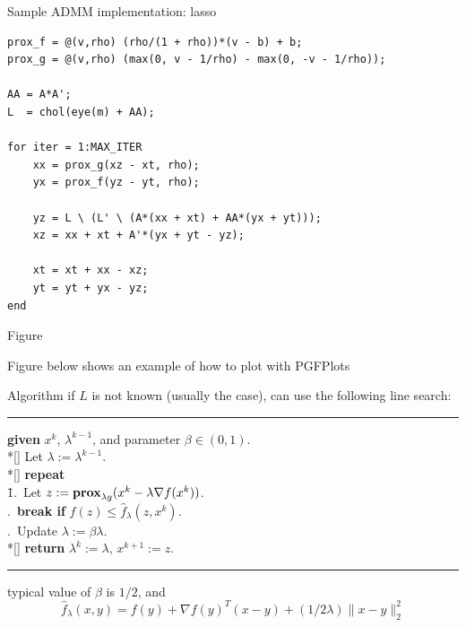 \documentclass[aspectratio=169,10pt,mathserif]{beamer}
\begin{document}
\begin{frame}[fragile]{Sample ADMM implementation: lasso}
	\small
\begin{verbatim}
prox_f = @(v,rho) (rho/(1 + rho))*(v - b) + b;
prox_g = @(v,rho) (max(0, v - 1/rho) - max(0, -v - 1/rho));

AA = A*A';
L  = chol(eye(m) + AA);

for iter = 1:MAX_ITER
    xx = prox_g(xz - xt, rho);
    yx = prox_f(yz - yt, rho);

    yz = L \ (L' \ (A*(xx + xt) + AA*(yx + yt)));
    xz = xx + xt + A'*(yx + yt - yz);

    xt = xt + xx - xz;
    yt = yt + yx - yz;
end
\end{verbatim}
\end{frame}

\begin{frame}{Figure}
\begin{center}
Figure below shows an example of how to plot with PGFPlots
\begin{figure}
\end{figure}
\end{center}
\end{frame}

\begin{frame}{Algorithm}
    if $L$ is not known (usually the case), can use the following line search:
    \noindent\rule[-5pt]{\textwidth}{0.4pt}
    {\footnotesize
    \begin{tabbing}
        {\bf given} $x^k$, $\lambda^{k-1}$, and parameter $\beta \in (0,1)$. \\*[\smallskipamount]
        Let $\lambda := \lambda^{k-1}$. \\*[\smallskipamount]
        {\bf repeat} \\
        \qquad \= 1.\ Let $z := \mathop{\bf prox}_{\lambda g}(x^{k} - \lambda \nabla f(x^{k}))$. \\
        .\ {\bf break if} $f(z) \leq \hat{f}_{\lambda}(z, x^{k})$. \\
        .\ Update $\lambda := \beta \lambda$. \\*[\smallskipamount]
        {\bf return} $\lambda^{k} := \lambda$, $x^{k+1}:=z$.
    \end{tabbing}}
    \noindent\rule[10pt]{\textwidth}{0.4pt}

    typical value of $\beta$ is $1/2$, and
    \[
    \hat{f}_\lambda(x,y) = f(y) + \nabla f(y)^T (x - y) +
    (1/2\lambda)\|x - y\|_2^2
    \]
\end{frame}
\end{document}
